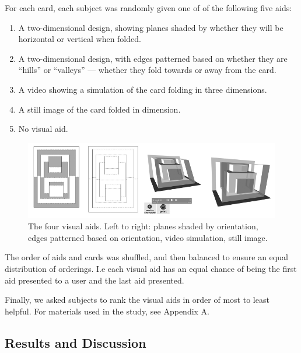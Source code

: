 For each card, each subject was randomly given one of of the following
five aids:

\begin{enumerate}
\def\labelenumi{\arabic{enumi})}
\itemsep1pt\parskip0pt
\item
  A two-dimensional design, showing planes shaded by whether they will
  be horizontal or vertical when folded.
\item
  A two-dimensional design, with edges patterned based on whether they
  are ``hills'' or ``valleys'' --- whether they fold towards or away
  from the card.
\item
  A video showing a simulation of the card folding in three dimensions.
\item
  A still image of the card folded in dimension.
\item
  No visual aid.
\end{enumerate}

\begin{figure}[htbp]
\centering
\includegraphics{figures/51_User_Study_Visual_Aids/visualAids.pdf}
\caption{The four visual aids. Left to right: planes shaded by
orientation, edges patterned based on orientation, video simulation,
still image.}
\end{figure}

The order of aids and cards was shuffled, and then balanced to ensure an
equal distribution of orderings. I.e each visual aid has an equal chance
of being the first aid presented to a user and the last aid presented.

Finally, we asked subjects to rank the visual aids in order of most to
least helpful. For materials used in the study, see Appendix A.

\subsection{Results and Discussion}\label{results-and-discussion}


